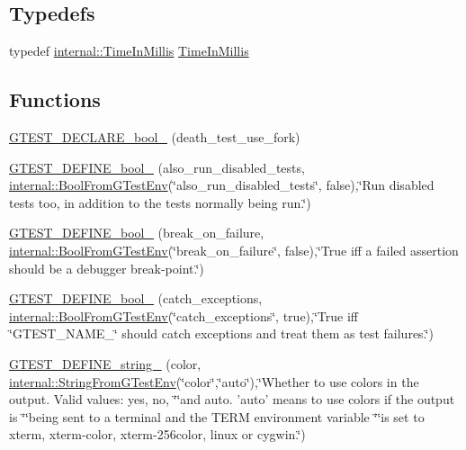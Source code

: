 \subsection*{\-Typedefs}
\begin{DoxyCompactItemize}
\item 
typedef \hyperlink{namespacetesting_1_1internal_a9e0fb32f592d143f031a3431366adae0}{internal\-::\-Time\-In\-Millis} \hyperlink{namespacetesting_a338e9fd9474f0d8fafcb28b05f66a630}{\-Time\-In\-Millis}
\end{DoxyCompactItemize}
\subsection*{\-Functions}
\begin{DoxyCompactItemize}
\item 
\hyperlink{namespacetesting_ad18df0380e9015a496c410c30e66b0e1}{\-G\-T\-E\-S\-T\-\_\-\-D\-E\-C\-L\-A\-R\-E\-\_\-bool\-\_\-} (death\-\_\-test\-\_\-use\-\_\-fork)
\item 
\hyperlink{namespacetesting_a531ff780002eba452569e9460c1ef9d0}{\-G\-T\-E\-S\-T\-\_\-\-D\-E\-F\-I\-N\-E\-\_\-bool\-\_\-} (also\-\_\-run\-\_\-disabled\-\_\-tests, \hyperlink{namespacetesting_1_1internal_af17bf74326e1076c47455ef2618c1a1a}{internal\-::\-Bool\-From\-G\-Test\-Env}(\char`\"{}also\-\_\-run\-\_\-disabled\-\_\-tests\char`\"{}, false),\char`\"{}\-Run disabled tests too, in addition to the tests normally being run.\char`\"{})
\item 
\hyperlink{namespacetesting_a0e26d20c87cb9c7eeeda10d6ac6721f3}{\-G\-T\-E\-S\-T\-\_\-\-D\-E\-F\-I\-N\-E\-\_\-bool\-\_\-} (break\-\_\-on\-\_\-failure, \hyperlink{namespacetesting_1_1internal_af17bf74326e1076c47455ef2618c1a1a}{internal\-::\-Bool\-From\-G\-Test\-Env}(\char`\"{}break\-\_\-on\-\_\-failure\char`\"{}, false),\char`\"{}\-True iff a failed assertion should be a debugger break-\/point.\char`\"{})
\item 
\hyperlink{namespacetesting_ad44717d223b0a534027184b6adb5c834}{\-G\-T\-E\-S\-T\-\_\-\-D\-E\-F\-I\-N\-E\-\_\-bool\-\_\-} (catch\-\_\-exceptions, \hyperlink{namespacetesting_1_1internal_af17bf74326e1076c47455ef2618c1a1a}{internal\-::\-Bool\-From\-G\-Test\-Env}(\char`\"{}catch\-\_\-exceptions\char`\"{}, true),\char`\"{}\-True iff \char`\"{}\-G\-T\-E\-S\-T\-\_\-\-N\-A\-M\-E\-\_\-\char`\"{} should catch exceptions and treat them as test failures.\char`\"{})
\item 
\hyperlink{namespacetesting_ab239ee3e29f0fe79791cdce90600cbc0}{\-G\-T\-E\-S\-T\-\_\-\-D\-E\-F\-I\-N\-E\-\_\-string\-\_\-} (color, \hyperlink{namespacetesting_1_1internal_a0154be115eea16783f82d3642ff27940}{internal\-::\-String\-From\-G\-Test\-Env}(\char`\"{}color\char`\"{},\char`\"{}auto\char`\"{}),\char`\"{}\-Whether to use colors in the output.  \-Valid values\-: yes, no, \char`\"{}\char`\"{}and auto.  'auto' means to use colors if the output is \char`\"{}\char`\"{}being sent to a terminal and the \-T\-E\-R\-M environment variable \char`\"{}\char`\"{}is set to xterm, xterm-\/color, xterm-\/256color, linux or cygwin.\char`\"{})

\end{DoxyCompactItemize}
